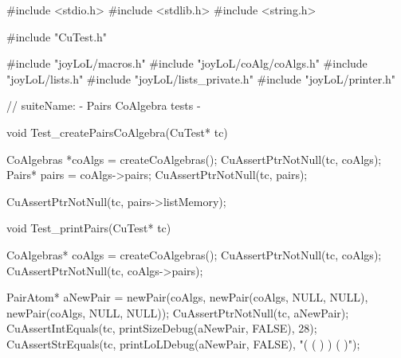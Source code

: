 \starttyping
#include <stdio.h>
#include <stdlib.h>
#include <string.h>

#include "CuTest.h"

#include "joyLoL/macros.h"
#include "joyLoL/coAlg/coAlgs.h"
#include "joyLoL/lists.h"
#include "joyLoL/lists_private.h"
#include "joyLoL/printer.h"

// suiteName: - Pairs CoAlgebra tests -

void Test_createPairsCoAlgebra(CuTest* tc) {
  CoAlgebras *coAlgs = createCoAlgebras();
  CuAssertPtrNotNull(tc, coAlgs);
  Pairs* pairs = coAlgs->pairs;
  CuAssertPtrNotNull(tc, pairs);

  CuAssertPtrNotNull(tc, pairs->listMemory);
}

void Test_printPairs(CuTest* tc) {
  CoAlgebras* coAlgs = createCoAlgebras();
  CuAssertPtrNotNull(tc, coAlgs);
  CuAssertPtrNotNull(tc, coAlgs->pairs);

  PairAtom* aNewPair = newPair(coAlgs,
                               newPair(coAlgs, NULL, NULL),
                               newPair(coAlgs, NULL, NULL));
  CuAssertPtrNotNull(tc, aNewPair);
  CuAssertIntEquals(tc, printSizeDebug(aNewPair, FALSE), 28);
  CuAssertStrEquals(tc, printLoLDebug(aNewPair, FALSE), "( ( ) ) ( )");
}
\stoptyping
